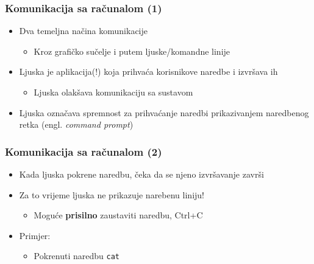 \documentclass{beamer}
\newcommand{\shell}[1]{\texttt{#1}}
\begin{document}
\begin{frame}[t]
\frametitle{Komunikacija sa računalom (1)}
\begin{itemize}
  \item Dva temeljna načina komunikacije
  \begin{itemize}
    \item Kroz grafičko sučelje i putem ljuske/komandne linije
  \end{itemize}
  \item Ljuska je aplikacija(!) koja prihvaća korisnikove naredbe i 
        izvršava ih
  \begin{itemize}
    \item Ljuska olakšava komunikaciju sa sustavom
  \end{itemize}
  \item Ljuska označava spremnost za prihvaćanje naredbi prikazivanjem 
        naredbenog retka (engl. \emph{command prompt})
\end{itemize}
\end{frame}

\begin{frame}[t]
\frametitle{Komunikacija sa računalom (2)}
\begin{itemize}
  \item Kada ljuska pokrene naredbu, čeka da se njeno izvršavanje 
        završi
  \item Za to vrijeme ljuska ne prikazuje narebenu liniju!
  \begin{itemize}
    \item Moguće \textbf{prisilno} zaustaviti naredbu, Ctrl+C
  \end{itemize}
  \item Primjer:
  \begin{itemize}
    \item Pokrenuti naredbu \shell{cat}
  \end{itemize}
\end{itemize}
\end{frame}
\end{document}
